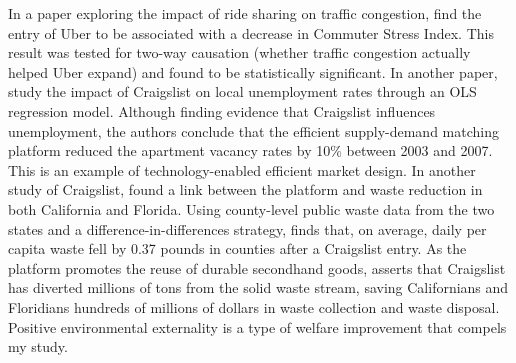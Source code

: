 \documentclass[12pt]{article}
\begin{document}
			\par
			In a paper exploring the impact of ride sharing on traffic congestion, \citet{li2016ride} find the entry of Uber to be associated with a decrease in Commuter Stress Index. This result was tested for two-way causation (whether traffic congestion actually helped Uber expand) and found to be statistically significant. In another paper, \citet{kroft2014does} study the impact of Craigslist on local unemployment rates through an OLS regression model. Although finding evidence that Craigslist influences unemployment, the authors conclude that the efficient supply-demand matching platform reduced the apartment vacancy rates by 10\% between 2003 and 2007. This is an example of technology-enabled efficient market design. In another study of Craigslist, \citet{fremstad2017does} found a link between the platform and waste reduction in both California and Florida. Using county-level public waste data from the two states and a difference-in-differences strategy, \citet{fremstad2017does} finds that, on average, daily per capita waste fell by 0.37 pounds in counties after a Craigslist entry. As the platform promotes the reuse of durable secondhand goods, \citet{fremstad2017does} asserts that Craigslist has diverted millions of tons from the solid waste stream, saving Californians and Floridians hundreds of millions of dollars in waste collection and waste disposal. Positive environmental externality is a type of welfare improvement that compels my study.
			
\end{document}
